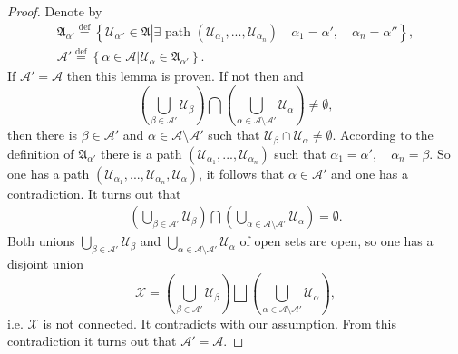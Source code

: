 \documentclass[10]{article}
\theoremstyle{plain}
\theoremstyle{definition}
\theoremstyle{definition}
\numberwithin{equation}{section}
\renewcommand{\a}{\alpha}                    %
\newcommand{\7}{\dagger}                     %
\newcommand{\8}{\bullet}                     %
\renewcommand{\.}{\cdot}                     %
\renewcommand{\:}{\colon}                    %
\newcommand{\sU}{\mathcal{U}}       %
\newcommand{\sX}{\mathcal{X}}       %
\newcommand{\bydef}{\stackrel{\mathrm{def}}{=}}          %
\newcommand{\bt}{\beta}           %
\renewcommand{\:}{\colon}           %
\newcommand{\bean}{\begin{eqnarray*}}
\newcommand{\eean}{\end{eqnarray*}}
\begin{document}
		\begin{proof}
			Denote by
			\bean
			\mathfrak{A}_{\a'}\bydef \left\{\sU_{\a''}\in \mathfrak A\left|\exists \text{ path }\left(\sU_{\a_1},...,\sU_{\a_n}\right)\quad\a_1 = \a',\quad \a_n = \a'' \right.\right\},\\
			\mathscr A'\bydef \left\{\left.\a \in \mathscr A\right| \sU_{\a} \in\mathfrak{A}_{\a'} \right\}.
			\eean
			If $\mathscr A'=\mathscr A$ then this lemma is proven. If not then  and 
			$$
			\left( \bigcup_{\bt \in\mathscr A'}\sU_{\bt}\right) \bigcap \left( \bigcup_{\a \in\mathscr A\setminus\mathscr A'}\sU_{\a}\right)\neq \emptyset,
			$$
			then there is  $\bt \in\mathscr A'$ and $\a \in\mathscr A\setminus\mathscr A'$ such that $\sU_{\bt}\cap \sU_{\a}\neq \emptyset$. According to the definition of $\mathfrak{A}_{\a'}$ there is a path $\left(\sU_{\a_1},...,\sU_{\a_n}\right)$ such that $\a_1 = \a',\quad \a_n = \bt$. So one has a path $\left(\sU_{\a_1},...,\sU_{\a_n}, \sU_{\a} \right)$, it follows that $\a \in \mathscr A'$ and one has a contradiction. It turns out that 
			\bean
			\left( \bigcup_{\bt \in\mathscr A'}\sU_{\bt}\right) \bigcap \left( \bigcup_{\a \in\mathscr A\setminus\mathscr A'}\sU_{\a}\right)= \emptyset.
			\eean
			Both unions $\bigcup_{\bt \in\mathscr A'}\sU_{\bt}$ and  $\bigcup_{\a \in\mathscr A\setminus\mathscr A'}\sU_{\a}$ of open sets are open, so one has a disjoint union
			$$
			\sX = \left( \bigcup_{\bt \in\mathscr A'}\sU_{\bt}\right) \bigsqcup \left( \bigcup_{\a \in\mathscr A\setminus\mathscr A'}\sU_{\a}\right),
			$$
			i.e.  $\sX$ is not connected. It contradicts with our assumption.	From this contradiction it turns out that $\mathscr A' = \mathscr A$.  
		\end{proof}
		
\end{document}
